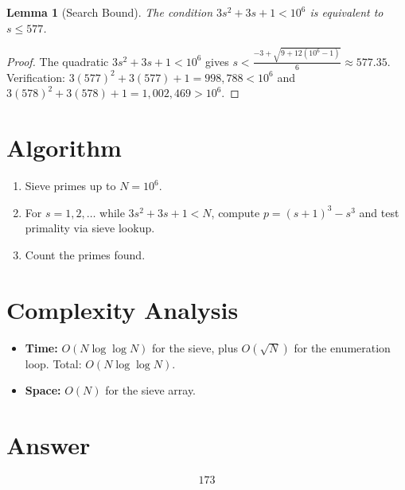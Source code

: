 \documentclass[12pt]{article}
\newtheorem{lemma}[theorem]{Lemma}
\begin{document}
\begin{lemma}[Search Bound]
The condition $3s^2 + 3s + 1 < 10^6$ is equivalent to $s \leq 577$.
\end{lemma}

\begin{proof}
The quadratic $3s^2 + 3s + 1 < 10^6$ gives $s < \frac{-3 + \sqrt{9 + 12(10^6 - 1)}}{6} \approx 577.35$. Verification: $3(577)^2 + 3(577) + 1 = 998{,}788 < 10^6$ and $3(578)^2 + 3(578) + 1 = 1{,}002{,}469 > 10^6$.
\end{proof}

\section{Algorithm}
\begin{enumerate}
    \item Sieve primes up to $N = 10^6$.
    \item For $s = 1, 2, \ldots$ while $3s^2 + 3s + 1 < N$, compute $p = (s+1)^3 - s^3$ and test primality via sieve lookup.
    \item Count the primes found.
\end{enumerate}

\section{Complexity Analysis}
\begin{itemize}
    \item \textbf{Time:} $O(N \log\log N)$ for the sieve, plus $O(\sqrt{N})$ for the enumeration loop. Total: $O(N \log\log N)$.
    \item \textbf{Space:} $O(N)$ for the sieve array.
\end{itemize}

\section{Answer}

\[
\boxed{173}
\]
\end{document}
